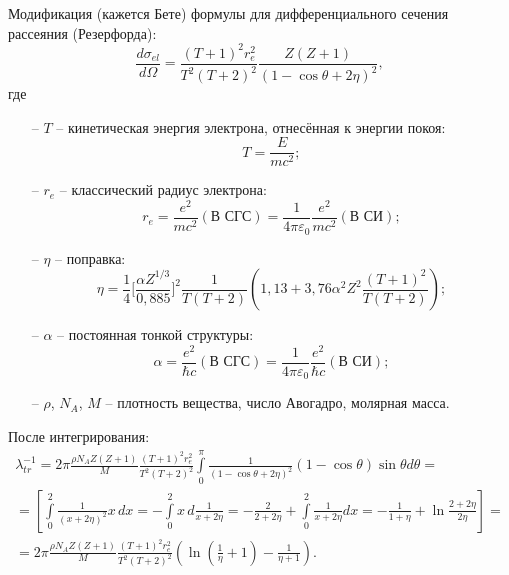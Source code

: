 \documentclass[a4paper,12pt]{article} %
\newcommand{\Dff}[2]{\frac{d #1}{d #2}}
\newcommand{\eps}{\varepsilon}
\begin{document}
Модификация (кажется Бете) формулы для дифференциального сечения рассеяния (Резерфорда):
\begin{equation}
	\Dff{\sigma_{el}}{\Omega} =
	\frac{(T+1)^2 r_e^2}{T^2(T+2)^2} \frac{Z(Z+1)}{(1 - \cos \theta + 2 \eta)^2},
\end{equation}
где
\begin{itemize}
	\item[--] $T$ -- кинетическая энергия электрона, отнесённая к энергии покоя:
	\begin{equation}
		T = \frac{E}{mc^2};
	\end{equation} 
	\item[--] $r_e$ -- классический радиус электрона:
	\begin{equation}
		r_e = \frac{e^2}{mc^2} (\text{В СГС}) = \frac{1}{4 \pi \eps_0}\frac{e^2}{mc^2} (\text{В СИ});
	\end{equation}
	\item[--] $\eta$ -- поправка:
	\begin{equation}
		\eta = \frac{1}{4}
		\Big[
			\frac{\alpha Z^{1/3}}{0{,}885}
		\Big]^2
		\frac{1}{T(T+2)} \left(1{,}13 + 3{,}76 \alpha^2 Z^2 \frac{(T+1)^2}{T(T+2)} \right);
	\end{equation}
	\item[--] $\alpha$ -- постоянная тонкой структуры:
	\begin{equation}
		\alpha = \frac{e^2}{\hbar c} (\text{В СГС}) = \frac{1}{4 \pi \eps_0} \frac{e^2}{\hbar c} (\text{В СИ});
	\end{equation}
	\item[--] $\rho$, $N_A$, $M$ -- плотность вещества, число Авогадро, молярная масса.
\end{itemize}

После интегрирования:
\begin{equation}
	\begin{gathered}
		\lambda_{tr}^{-1} = 
		2 \pi \frac{\rho N_AZ(Z+1)}{M} 
		\frac{(T+1)^2 r_e^2}{T^2(T+2)^2}
		\int\limits_{0}^{\pi}
		\frac{1}{(1 - \cos \theta + 2 \eta)^2} (1 - \cos \theta) \sin \theta d \theta 
		= \\ =
		\left[
			\int\limits_{0}^{2} \frac{1}{(x + 2 \eta)^2} x\, dx =
			- \int\limits_{0}^{2}  x\, d\frac{1}{x + 2 \eta} =
			-\frac{2}{2 + 2 \eta} + \int\limits_{0}^{2} \frac{1}{x + 2 \eta} dx =
			-\frac{1}{1 + \eta} + \ln \frac{2 +  2 \eta}{2 \eta}
		\right]	
		= \\ =
		2 \pi \frac{\rho N_AZ(Z+1)}{M} 
		\frac{(T+1)^2 r_e^2}{T^2(T+2)^2}
		\left(
			\ln \left( \frac{1}{\eta} + 1 \right) - \frac{1}{\eta + 1}
		\right).
	\end{gathered}	
\end{equation}
\end{document}
